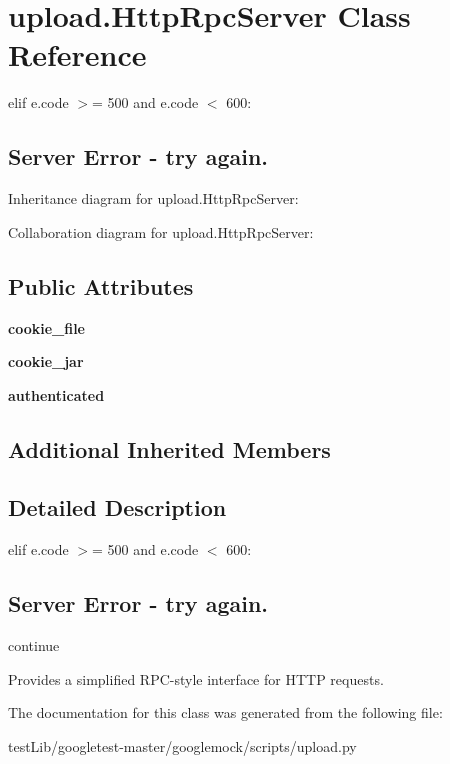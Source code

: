 \hypertarget{classupload_1_1HttpRpcServer}{}\section{upload.\+Http\+Rpc\+Server Class Reference}
\label{classupload_1_1HttpRpcServer}


elif e.\+code $>$= 500 and e.\+code $<$ 600\+: \subsection*{Server Error -\/ try again.} 




Inheritance diagram for upload.\+Http\+Rpc\+Server\+:


Collaboration diagram for upload.\+Http\+Rpc\+Server\+:
\subsection*{Public Attributes}
\begin{DoxyCompactItemize}
\item 
\mbox{\label{classupload_1_1HttpRpcServer_ad5c1a730c030f9d3b5f70c2e0d8b9a1d}} 
{\bfseries cookie\+\_\+file}
\item 
\mbox{\label{classupload_1_1HttpRpcServer_a1b9c9af7f0a46afd84a9d524782323bf}} 
{\bfseries cookie\+\_\+jar}
\item 
\mbox{\label{classupload_1_1HttpRpcServer_aaa356e2491537dd0d4bfc5b1bb0fec96}} 
{\bfseries authenticated}
\end{DoxyCompactItemize}
\subsection*{Additional Inherited Members}


\subsection{Detailed Description}
elif e.\+code $>$= 500 and e.\+code $<$ 600\+: \subsection*{Server Error -\/ try again.}

continue \begin{DoxyVerb}Provides a simplified RPC-style interface for HTTP requests.\end{DoxyVerb}
 

The documentation for this class was generated from the following file\+:\begin{DoxyCompactItemize}
\item 
test\+Lib/googletest-\/master/googlemock/scripts/upload.\+py\end{DoxyCompactItemize}
